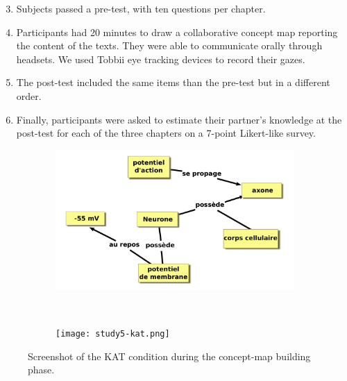 \documentclass[natbib]{svjour3}
\begin{document}
\begin{enumerate}
    \setcounter{enumi}{2}

    \item Subjects passed a pre-test, with ten questions per chapter. 

    \item Participants had 20 minutes to draw a collaborative concept map
        reporting the content of the texts. They were able to communicate
        orally through headsets.  We used Tobbii eye tracking devices to
        record their gazes.

    \item The post-test included the same items than the pre-test but in a
        different order. 

    \item  Finally, participants were asked to estimate their partner's
        knowledge at the post-test for each of the three chapters on a 7-point
        Likert-like survey. 

\end{enumerate}

\begin{figure}[h!t]
        \centering
        \begin{subfigure}{.6\textwidth}
            \includegraphics[width=\linewidth]{study5-conceptmap.pdf}
        \end{subfigure} \\
        \begin{subfigure}{.7\textwidth}
            \texttt{[image: study5-kat.png]}
        \end{subfigure}
        \caption{Screenshot of the KAT condition during the concept-map building
        phase.}
        \label{study5:kat}
\end{figure}
\end{document}
